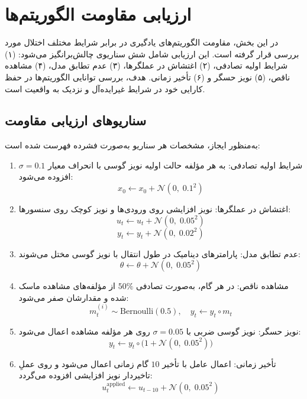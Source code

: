 \section{ارزیابی مقاومت الگوریتم‌ها}
\label{sec:robustness_evaluation}

در این بخش، مقاومت الگوریتم‌های یادگیری در برابر شرایط مختلف اختلال مورد بررسی قرار گرفته است. این ارزیابی شامل شش سناریوی چالش‌برانگیز می‌شود: (۱) شرایط اولیه تصادفی، (۲) اغتشاش در عملگرها، (۳) عدم تطابق مدل، (۴) مشاهده ناقص، (۵) نویز حسگر و (۶) تأخیر زمانی. هدف، بررسی توانایی الگوریتم‌ها در حفظ کارایی خود در شرایط غیرایده‌آل و نزدیک به واقعیت است.

\subsection{سناریوهای ارزیابی مقاومت}

به‌منظور ایجاز، مشخصات هر سناریو به‌صورت فشرده فهرست شده است:
\begin{enumerate}
  \item شرایط اولیه تصادفی: به هر مؤلفه حالت اولیه نویز گوسی با انحراف معیار $\sigma{=}0.1$ افزوده می‌شود:
  \[
  x_0 \leftarrow x_0 + \mathcal{N}(0,\;0.1^2)
  \]
  \item اغتشاش در عملگرها: نویز افزایشی روی ورودی‌ها و نویز کوچک روی سنسورها:
  \[
  u_t \leftarrow u_t + \mathcal{N}(0,\;0.05^2)
  \]
  \[
  y_t \leftarrow y_t + \mathcal{N}(0,\;0.02^2)
  \]
  \item عدم تطابق مدل: پارامترهای دینامیک در طول انتقال با نویز گوسی مختل می‌شوند:
  \[
  \theta \leftarrow \theta + \mathcal{N}(0,\;0.05^2)
  \]
  \item مشاهده ناقص: در هر گام، به‌صورت تصادفی $50\%$ از مؤلفه‌های مشاهده ماسک شده و مقدارشان صفر می‌شود:
  \[
  m_t^{(i)} \sim \mathrm{Bernoulli}(0.5), \quad
  y_t \leftarrow y_t \circ m_t
  \]
  \item نویز حسگر: نویز گوسی ضربی با $\sigma{=}0.05$ روی هر مؤلفه مشاهده اعمال می‌شود:
  \[
  y_t \leftarrow y_t \circ \bigl(1 + \mathcal{N}(0,\;0.05^2)\bigr)
  \]
  \item تأخیر زمانی: اعمال عامل با تأخیر $10$ گام زمانی اعمال می‌شود و روی عملِ تاخیردار نویز افزایشی افزوده می‌گردد:
  \[
  u_t^{\mathrm{applied}} \leftarrow u_{t-10} + \mathcal{N}(0,\;0.05^2)
  \]
\end{enumerate}





 






























